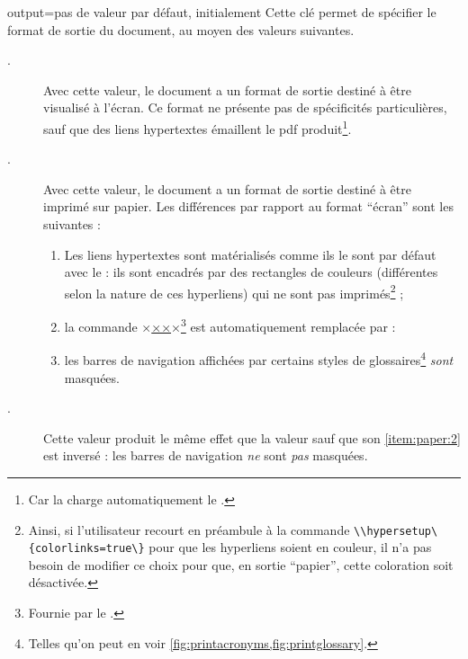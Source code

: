 \begin{docKey}{output}{=\textbar{}\textbar{}}{pas
    de valeur par défaut, initialement }
  Cette clé permet de spécifier le format de sortie du document, au moyen des
  valeurs suivantes.
  \begin{description}
  \item[.] Avec cette valeur, le document a un format de
    sortie destiné à être visualisé à l'écran. Ce format ne présente pas de
    spécificités particulières, sauf que des liens hypertextes émaillent le
    \acrshort{pdf} produit\footnote{Car la \yatcl{} charge automatiquement le
      .}.
  \item[.] Avec cette valeur, le document a un format de sortie
    destiné à être imprimé sur papier. Les différences par rapport au format
    \enquote{écran} sont les suivantes :
    \begin{enumerate}
    \item Les liens hypertextes sont matérialisés comme ils le sont par défaut
      avec le  : ils sont encadrés par des rectangles de
      couleurs (différentes selon la nature de ces hyperliens) qui ne sont pas
      imprimés\footnote{Ainsi, si l'utilisateur recourt en préambule à la
        commande \protect\lstinline|\\hypersetup\{colorlinks=true\}| pour que
        les hyperliens soient en couleur, il n'a pas besoin de modifier ce
        choix pour que, en sortie \enquote{papier}, cette coloration soit
        désactivée.} ;
    \item\label{item:paper:1} la commande
      ×\href{×\meta{\acrshort*{url}}×}{××}×\footnote{Fournie par le
        .} est automatiquement remplacée par :
    \item\label{item:paper:2} les barres de navigation affichées par certains
      styles de glossaires\footnote{Telles qu'on peut en voir
        \vref{fig:printacronyms,fig:printglossary}.} \emph{sont} masquées.
    \end{enumerate}
  \item[.] Cette valeur produit le même effet que la valeur
     sauf que son \vref{item:paper:2} est inversé : les barres
    de navigation \emph{ne} sont \emph{pas} masquées.
  \end{description}
\end{docKey}

